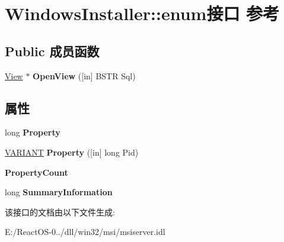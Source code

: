 \hypertarget{interface_windows_installer_1_1enum}{}\section{Windows\+Installer\+:\+:enum接口 参考}
\label{interface_windows_installer_1_1enum}
\subsection*{Public 成员函数}
\begin{DoxyCompactItemize}
\item 
\mbox{\label{interface_windows_installer_1_1enum_a189e4e69fdc960d61cc835e76d31d072}} 
\hyperlink{interface_windows_installer_1_1_view}{View} $\ast$ {\bfseries Open\+View} (\mbox{[}in\mbox{]} B\+S\+TR Sql)
\end{DoxyCompactItemize}
\subsection*{属性}
\begin{DoxyCompactItemize}
\item 
\mbox{\label{interface_windows_installer_1_1enum_ad3aaeb21d4732acb120e87c09da29bfc}} 
long {\bfseries Property}
\item 
\mbox{\label{interface_windows_installer_1_1enum_a97fcf59ff11f55167249350989e185a8}} 
\hyperlink{structtag_v_a_r_i_a_n_t}{V\+A\+R\+I\+A\+NT} {\bfseries Property} (\mbox{[}in\mbox{]} long Pid)
\item 
\mbox{\label{interface_windows_installer_1_1enum_ae9b005bb3ae5880fd26e2f39c5f447d6}} 
{\bfseries Property\+Count}
\item 
\mbox{\label{interface_windows_installer_1_1enum_a3ecf3dd098eb57981cecceba6db93b8b}} 
long {\bfseries Summary\+Information}
\end{DoxyCompactItemize}


该接口的文档由以下文件生成\+:\begin{DoxyCompactItemize}
\item 
E\+:/\+React\+O\+S-\/0../dll/win32/msi/msiserver.\+idl\end{DoxyCompactItemize}
